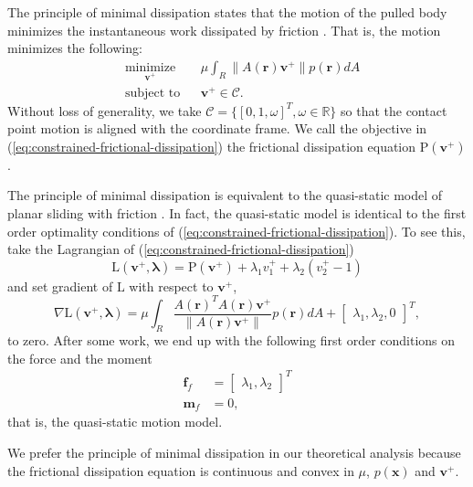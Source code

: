 \documentclass[conference]{IEEEtran}
\begin{document}
The principle of minimal dissipation states that the motion of the
pulled body minimizes the instantaneous work dissipated by friction
\cite{alexander1993bounds}. That is, the motion minimizes the
following: 
\begin{equation}
\begin{aligned}
& \underset{\mathbf{v}^+}{\text{minimize}}
& & \mu\int_R\lVert A(\mathbf{r})\mathbf{v}^+ \rVert p(\mathbf{r}) dA \\
& \text{subject to}
& & \mathbf{v}^+ \in \mathcal{C}.
\end{aligned} \label{eq:constrained-frictional-dissipation}
\end{equation}
Without loss of generality, we take
$\mathcal{C} = \{[0,1,\omega]^T, \omega \in \mathbb{R}\}$ so that the
contact point motion is aligned with the coordinate frame. We call the
objective in (\ref{eq:constrained-frictional-dissipation}) the
frictional dissipation equation $\mathrm{P}(\mathbf{v}^+)$.

The principle of minimal dissipation is equivalent to the quasi-static
model of planar sliding with friction \cite{alexander1993bounds}.  In
fact, the quasi-static model is identical to the first order
optimality conditions of
(\ref{eq:constrained-frictional-dissipation}). To see this, take the
Lagrangian of (\ref{eq:constrained-frictional-dissipation})
\begin{equation}
  \mathrm{L}(\mathbf{v}^+,\mathbf{\lambda}) = \mathrm{P}(\mathbf{v}^+) + \lambda_1v^+_1 + \lambda_2(v^+_2-1)
\end{equation}
and set gradient of $\mathrm{L}$ with respect to $\mathbf{v}^+$,
\begin{equation}
  \nabla\mathrm{L}(\mathbf{v}^+,\mathbf{\lambda}) = \mu\int_R\frac{A(\mathbf{r})^TA(\mathbf{r})\mathbf{v}^+}{\lVert A(\mathbf{r})\mathbf{v}^+ \rVert} p(\mathbf{r}) dA + \begin{bmatrix}\lambda_1, \lambda_2, 0\end{bmatrix}^T,
\end{equation}
to zero. After some work, we end up with the following first order
conditions on the force and the moment
\begin{align}
  \mathbf{f}_f &= \begin{bmatrix}\lambda_1, \lambda_2\end{bmatrix}^T\\
  \mathbf{m}_f &= 0,
\end{align}
that is, the quasi-static motion model.

We prefer the principle of minimal dissipation in our theoretical
analysis because the frictional dissipation equation is continuous and
convex in $\mu$, $p(\mathbf{x})$ and $\mathbf{v}^+$.
\end{document}
